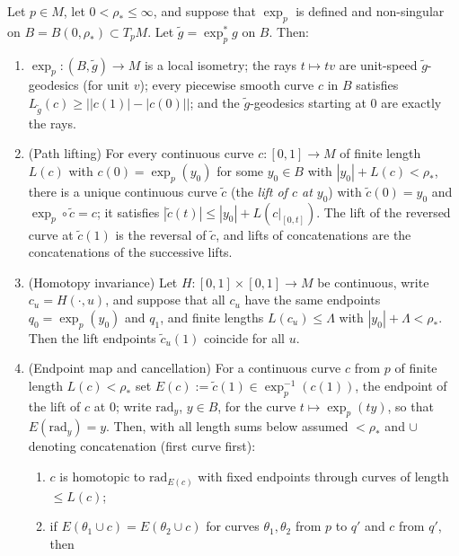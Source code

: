 \begin{lemma}
\label{lem:pullback-ball}



Let $p\in M$, let $0<\rho_*\le\infty$, and suppose that
$\exp_p$ is defined and non-singular on
$B=B(0,\rho_*)\subset T_pM$. Let $\tilde g=\exp_p^*g$ on $B$.
Then:
\begin{enumerate}
\item $\exp_p\colon (B,\tilde g)\to M$ is a local isometry; the
rays $t\mapsto tv$ are unit-speed $\tilde g$-geodesics (for unit
$v$); every piecewise smooth curve $c$ in $B$ satisfies
$L_{\tilde g}(c)\ge\bigl||c(1)|-|c(0)|\bigr|$; and the
$\tilde g$-geodesics starting at $0$ are exactly the rays.
\item (Path lifting) For every continuous curve $c\colon[0,1]\to M$
of finite length $L(c)$ with $c(0)=\exp_p(y_0)$ for some
$y_0\in B$ with $|y_0|+L(c)<\rho_*$, there is a unique continuous
curve $\tilde c$ (the \emph{lift of $c$ at $y_0$}) with $\tilde
c(0)=y_0$ and $\exp_p\circ\tilde c=c$; it satisfies $|\tilde
c(t)|\le|y_0|+L(c|_{[0,t]})$. The lift of the reversed curve at
$\tilde c(1)$ is the reversal of $\tilde c$, and lifts of
concatenations are the concatenations of the successive lifts.
\item (Homotopy invariance) Let $H\colon[0,1]\times[0,1]\to M$ be
continuous, write $c_u=H(\cdot,u)$, and suppose that all $c_u$ have
the same endpoints $q_0=\exp_p(y_0)$ and $q_1$, and finite
lengths $L(c_u)\le\Lambda$ with $|y_0|+\Lambda<\rho_*$. Then the
lift endpoints $\tilde c_u(1)$ coincide for all $u$.
\item (Endpoint map and cancellation) For a continuous curve $c$
from $p$ of finite length $L(c)<\rho_*$ set
$E(c):=\tilde c(1)\in\exp_p^{-1}(c(1))$, the endpoint of the
lift of $c$ at $0$; write $\mathrm{rad}_y$, $y\in B$, for the curve
$t\mapsto\exp_p(ty)$, so that $E(\mathrm{rad}_y)=y$. Then, with
all length sums below assumed $<\rho_*$ and $\cup$ denoting
concatenation (first curve first):
\begin{enumerate}
\item[(a)] $c$ is homotopic to $\mathrm{rad}_{E(c)}$ with fixed
endpoints through curves of length $\le L(c)$;
\item[(b)] if $E(\theta_1\cup c)=E(\theta_2\cup c)$ for curves
$\theta_1,\theta_2$ from $p$ to $q'$ and $c$ from $q'$, then

\end{enumerate}
\end{enumerate}
\end{lemma}
